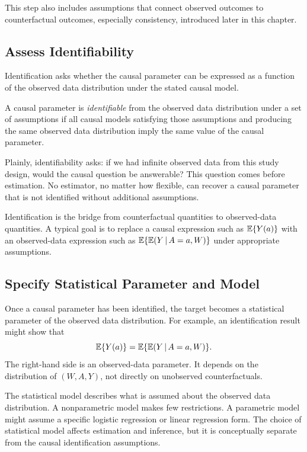 This step also includes assumptions that connect observed outcomes to counterfactual outcomes, especially consistency, introduced later in this chapter.

\subsection{Assess Identifiability}

Identification asks whether the causal parameter can be expressed as a function of the observed data distribution under the stated causal model.

\begin{definition}[Identifiability]
A causal parameter is \emph{identifiable} from the observed data distribution under a set of assumptions if all causal models satisfying those assumptions and producing the same observed data distribution imply the same value of the causal parameter.
\end{definition}

Plainly, identifiability asks: if we had infinite observed data from this study design, would the causal question be answerable? This question comes before estimation. No estimator, no matter how flexible, can recover a causal parameter that is not identified without additional assumptions.

\begin{identificationbox}
Identification is the bridge from counterfactual quantities to observed-data quantities. A typical goal is to replace a causal expression such as $\mathbb{E}\{Y(a)\}$ with an observed-data expression such as $\mathbb{E}\{\mathbb{E}(Y\,\vert\, A=a,W)\}$ under appropriate assumptions.
\end{identificationbox}

\subsection{Specify Statistical Parameter and Model}

Once a causal parameter has been identified, the target becomes a statistical parameter of the observed data distribution. For example, an identification result might show that
\[
\mathbb{E}\{Y(a)\}=\mathbb{E}\{\mathbb{E}(Y\,\vert\, A=a,W)\}.
\]
The right-hand side is an observed-data parameter. It depends on the distribution of $(W,A,Y)$, not directly on unobserved counterfactuals.

The statistical model describes what is assumed about the observed data distribution. A nonparametric model makes few restrictions. A parametric model might assume a specific logistic regression or linear regression form. The choice of statistical model affects estimation and inference, but it is conceptually separate from the causal identification assumptions.

